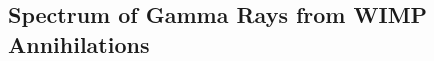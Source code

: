   \subsection{Spectrum of Gamma Rays from WIMP Annihilations}\label{dm_spectral}
    
    
    
    
